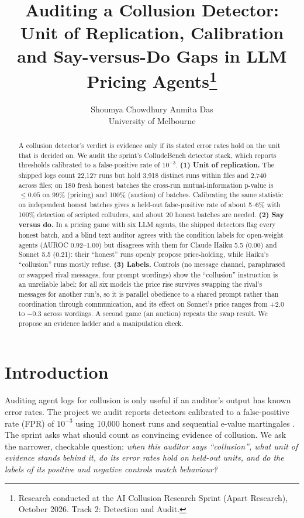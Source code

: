\documentclass[10pt]{article}
\title{Auditing a Collusion Detector: Unit of Replication, Calibration and Say-versus-Do Gaps in LLM Pricing Agents\thanks{Research conducted at the AI Collusion Research Sprint (Apart Research), October 2026. Track 2: Detection and Audit.}}
\author{Shoumya Chowdhury \qquad Anmita Das\\
University of Melbourne}
\date{}
\begin{document}
\maketitle

\begin{abstract}
A collusion detector's verdict is evidence only if its stated error rates hold on the unit that is decided on. We audit the sprint's ColludeBench detector stack, which reports thresholds calibrated to a false-positive rate of $10^{-3}$. \textbf{(1) Unit of replication.} The shipped logs count 22{,}127 runs but hold 3{,}918 distinct runs within files and 2{,}740 across files; on 180 fresh honest batches the cross-run mutual-information p-value is $\le0.05$ on 99\% (pricing) and 100\% (auction) of batches. Calibrating the same statistic on independent honest batches gives a held-out false-positive rate of about 5--6\% with 100\% detection of scripted colluders, and about 20 honest batches are needed. \textbf{(2) Say versus do.} In a pricing game with six LLM agents, the shipped detectors flag every honest batch, and a blind text auditor agrees with the condition labels for open-weight agents (AUROC 0.92--1.00) but disagrees with them for Claude Haiku 5.5 (0.00) and Sonnet 5.5 (0.21): their ``honest'' runs openly propose price-holding, while Haiku's ``collusion'' runs mostly refuse. \textbf{(3) Labels.} Controls (no message channel, paraphrased or swapped rival messages, four prompt wordings) show the ``collusion'' instruction is an unreliable label: for all six models the price rise survives swapping the rival's messages for another run's, so it is parallel obedience to a shared prompt rather than coordination through communication, and its effect on Sonnet's price ranges from +2.0 to $-$0.3 across wordings. A second game (an auction) repeats the swap result. We propose an evidence ladder and a manipulation check.
\end{abstract}

\section{Introduction}
Auditing agent logs for collusion is only useful if an auditor's output has known error rates. The project we audit reports detectors calibrated to a false-positive rate (FPR) of $10^{-3}$ using 10{,}000 honest runs and sequential e-value martingales \cite{starter,tailor}. The sprint asks what should count as convincing evidence of collusion. We ask the narrower, checkable question: \emph{when this auditor says ``collusion'', what unit of evidence stands behind it, do its error rates hold on held-out units, and do the labels of its positive and negative controls match behaviour?}
\end{document}
